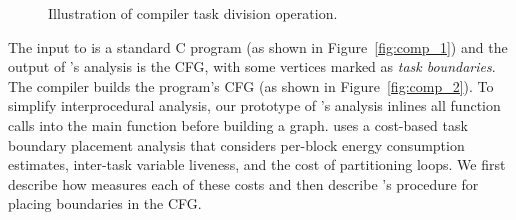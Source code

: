 \begin{figure}
	\centering
	\caption{Illustration of \sys compiler task division operation.}
	\label{fig:compiler_overview}
\end{figure}

The input to \sys is a standard C program (as shown in Figure~\ref{fig:comp_1})
and the output of \sys's analysis is the CFG, with some vertices marked as {\em
task boundaries}. 
%
The \sys compiler builds the program's CFG
(as shown in Figure~\ref{fig:comp_2}).  To simplify interprocedural analysis,
our prototype of \sys's analysis inlines all function calls into the main
function before building a graph. 
%
\sys uses a cost-based task boundary placement analysis that
considers per-block energy consumption estimates, inter-task variable liveness,
and the cost of partitioning loops.  We first describe how \sys measures each of these costs 
and then describe \sys's procedure for placing boundaries in the CFG.


